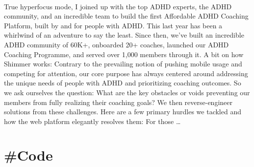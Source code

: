 \documentclass[10pt,a4paper]{article}
\begin{document}
\begin{multicols}{2}
\paragraph{}
 True hyperfocus mode, I joined up with the top ADHD experts, the ADHD community, and an incredible team to build the first Affordable ADHD Coaching Platform, built by and for people with ADHD.
This last year has been a whirlwind of an adventure to say the least. Since then, we’ve built an incredible ADHD community of 60K+, onboarded 20+ coaches, launched our ADHD Coaching Programme, and served over 1,000 members through it.
A bit on how Shimmer works:
Contrary to the prevailing notion of pushing mobile usage and competing for attention, our core purpose has always centered around addressing the unique needs of people with ADHD and prioritizing coaching outcomes. So we ask ourselves the question: What are the key obstacles or voids preventing our members from fully realizing their coaching goals? We then reverse-engineer solutions from these challenges. Here are a few primary hurdles we tackled and how the web platform elegantly resolves them:
For those
\dots\par
\end{multicols}

\newpage
\section{\#Code}
\end{document}
